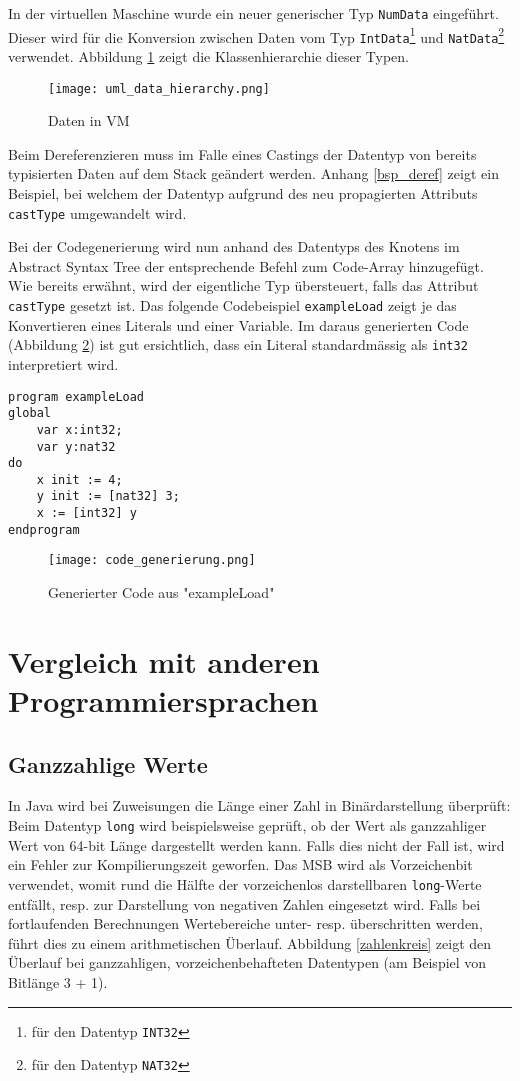 \documentclass[10pt, a4paper, twocolumn]{article} %
\begin{document}
In der virtuellen Maschine wurde ein neuer generischer Typ \texttt{NumData} eingeführt.
Dieser wird für die Konversion zwischen Daten vom Typ \texttt{IntData}\footnote{für den Datentyp \texttt{INT32}} und \texttt{NatData}\footnote{für den Datentyp \texttt{NAT32}} verwendet.
Abbildung \ref{data_hierarchy} zeigt die Klassenhierarchie dieser Typen.

\begin{figure}[H]
    \texttt{[image: uml\_data\_hierarchy.png]} %
    \caption{Daten in VM} %
    \label{data_hierarchy}
\end{figure}

Beim Dereferenzieren muss im Falle eines Castings der Datentyp von bereits typisierten Daten auf dem Stack geändert werden.
Anhang \ref{bsp_deref} zeigt ein Beispiel, bei welchem der Datentyp aufgrund des neu propagierten Attributs \texttt{castType} umgewandelt wird.

Bei der Codegenerierung wird nun anhand des Datentyps des Knotens im Abstract Syntax Tree der entsprechende Befehl zum Code-Array hinzugefügt.
Wie bereits erwähnt, wird der eigentliche Typ übersteuert, falls das Attribut \texttt{castType} gesetzt ist.
Das folgende Codebeispiel \texttt{exampleLoad} zeigt je das Konvertieren eines Literals und einer Variable.
Im daraus generierten Code (Abbildung \ref{codegenerierung}) ist gut ersichtlich, dass ein Literal standardmässig als \texttt{int32} interpretiert wird.

\begin{lstlisting}
program exampleLoad
global
    var x:int32;
    var y:nat32
do
    x init := 4;
    y init := [nat32] 3;
    x := [int32] y
endprogram
\end{lstlisting}

\begin{figure}[H]
    \texttt{[image: code\_generierung.png]}
    \caption{Generierter Code aus "exampleLoad"}
    \label{codegenerierung}
\end{figure}

\section{Vergleich mit anderen Programmiersprachen}
\subsection{Ganzzahlige Werte}
In Java wird bei Zuweisungen die Länge einer Zahl in Binärdarstellung überprüft:
Beim Datentyp \texttt{long} wird beispielsweise geprüft, ob der Wert als ganzzahliger Wert von 64-bit Länge dargestellt werden kann.
Falls dies nicht der Fall ist, wird ein Fehler zur Kompilierungszeit geworfen.
Das MSB wird als Vorzeichenbit verwendet, womit rund die Hälfte der vorzeichenlos darstellbaren \texttt{long}-Werte entfällt, resp. zur Darstellung von negativen Zahlen eingesetzt wird.
Falls bei fortlaufenden Berechnungen Wertebereiche unter- resp. überschritten werden, führt dies zu einem arithmetischen Überlauf.
Abbildung \ref{zahlenkreis}
zeigt den Überlauf bei ganzzahligen, vorzeichenbehafteten Datentypen (am Beispiel von Bitlänge 3 + 1).
\end{document}

